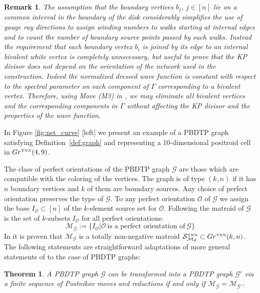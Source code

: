 \documentclass[11pt]{amsart}
\theoremstyle{plain}
\numberwithin{equation}{section}
\newtheorem{theorem}{Theorem}[subsection]
\newtheorem{remark}{Remark}[subsection]
\def \GTNN {{Gr^{\mbox{\tiny TNN}} (k,n)}}
\begin{document}
\begin{remark}
The assumption that the boundary vertices $b_j$, $j\in [n]$ lie on a common interval in the boundary of the disk considerably simplifies the use of gauge ray directions to assign winding numbers to walks starting at internal edges and to count the number of boundary source points passed by such walks.  
Instead the requirement that each boundary vertex $b_{i}$ is joined by its edge to an internal bivalent white vertex is completely unnecessary, but useful to prove that the KP divisor does not depend on the orientation of the network used in the construction. 
Indeed the normalized dressed wave function is constant with respect to the spectral parameter on each component of $\Gamma$ corresponding to a bivalent vertex. Therefore, using Move (M3) in \cite{Pos}, we may eliminate all bivalent vertices and the corresponding components in $\Gamma$ without affecting the KP divisor and the properties of the wave function. 
\end{remark}
In Figure \ref{fig:net_curve} [left] we present an example of a PBDTP graph satisfying Definition~\ref{def:graph} and representing a 10-dimensional positroid cell in $Gr^{\mbox{\tiny TNN}}(4,9)$. 

The class of perfect orientations of the PBDTP graph ${\mathcal G}$ are those which are compatible with the coloring of the vertices. The graph is of type $(k,n)$ if it has $n$ boundary vertices and $k$ of them are boundary sources. Any choice of perfect orientation preserves the type of ${\mathcal G}$. To any perfect orientation $\mathcal O$ of ${\mathcal G}$ we assign the base $I_{\mathcal O}\subset [n]$ of the $k$-element source set for $\mathcal O$. Following \cite{Pos} the matroid of ${\mathcal G}$ is the set of $k$-subsets  $I_{\mathcal O}$ for all perfect orientations:
$$
\mathcal M_{\mathcal G}:=\{I_{\mathcal O}|{\mathcal O}\ \mbox{is a perfect orientation of}\ \mathcal G \}
$$
In \cite{Pos} it is proven that $\mathcal M_{\mathcal G}$ is a totally non-negative matroid $\mathcal S^{\mbox{\tiny TNN}}_{\mathcal M_{\mathcal G}}\subset \GTNN$. The following statements are straightforward adaptations of more general statements of \cite{Pos} to the case of  PBDTP graphs:
\begin{theorem}
A PBDTP graph $\mathcal G$ can be transformed into a PBDTP graph $\mathcal G'$ via a finite sequence of Postnikov moves and reductions if and only if $\mathcal M_{\mathcal G}=\mathcal M_{\mathcal G'}$.
\end{theorem}
\end{document}
